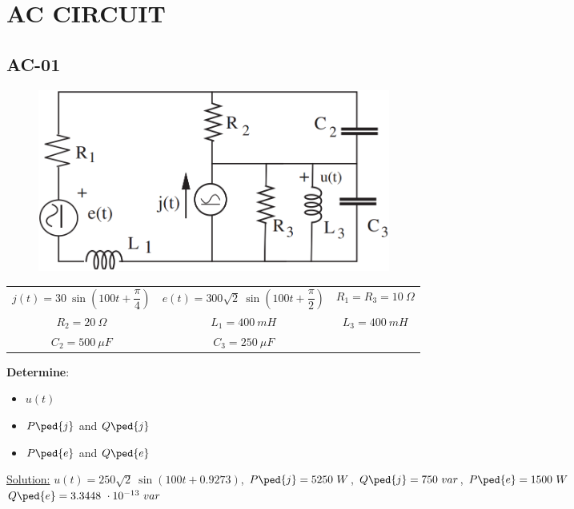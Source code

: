 \section{AC CIRCUIT}
\subsection{AC-01}
\begin{figure}[h]
\includegraphics[height=6cm]{img/2/01.png}
\centering
\end{figure}
\begin{center}
\begin{tabular}{ c c c }
  $j(t) = 30\ \sin{(100t + \dfrac{\pi}{4})}$ & $e(t) =300 \sqrt{2} \ \sin{(100t + \dfrac{\pi}{2})}$ & $R_1 = R_3 = 10 \ \Omega$\\
  $R_2 = 20 \ \Omega$ & $L_1 = 400\ mH $ & $L_3 = 400\ mH $\\
  $C_2 = 500 \ \mu F$ & $C_3 = 250 \ \mu F$\\
\end{tabular}
\end{center}
\textbf{Determine}:
\begin{itemize}
  \item $u(t)$
  \item $P\ped{j}$ and $Q\ped{j}$
  \item $P\ped{e}$ and $Q\ped{e}$
\end{itemize}
\underline{\large{Solution:}}
\newline
$u(t) =250 \sqrt{2} \ \sin{(100t + 0.9273)}$, $P\ped{j} = 5250\ W$, $Q\ped{j} = 750\ var$, $P\ped{e} = 1500\ W$\\
$Q\ped{e} = 3.3448\ \cdot 10^{-13}\ var$
